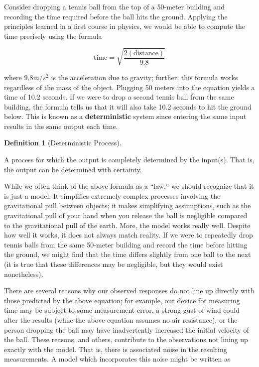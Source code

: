 \documentclass[
  letterpaper,
  DIV=11,
  numbers=noendperiod]{scrreprt}
\theoremstyle{definition}
\newtheorem{definition}{Definition}[chapter]
\theoremstyle{definition}
\theoremstyle{plain}
\theoremstyle{remark}
\begin{document}
Consider dropping a tennis ball from the top of a 50-meter building and
recording the time required before the ball hits the ground. Applying
the principles learned in a first course in physics, we would be able to
compute the time precisely using the formula

\[\text{time} = \sqrt{\frac{2(\text{distance})}{9.8}}\]

where \(9.8 m/s^2\) is the acceleration due to gravity; further, this
formula works regardless of the mass of the object. Plugging 50 meters
into the equation yields a time of 10.2 seconds. If we were to drop a
second tennis ball from the same building, the formula tells us that it
will also take 10.2 seconds to hit the ground below. This is known as a
\textbf{deterministic} system since entering the same input results in
the same output each time.

\begin{definition}[Deterministic
Process]\protect\hypertarget{def-deterministic-process}{}\label{def-deterministic-process}

A process for which the output is completely determined by the input(s).
That is, the output can be determined with certainty.

\end{definition}

While we often think of the above formula as a ``law,'' we should
recognize that it is just a model. It simplifies extremely complex
processes involving the gravitational pull between objects; it makes
simplifying assumptions, such as the gravitational pull of your hand
when you release the ball is negligible compared to the gravitational
pull of the earth. More, the model works really well. Despite how well
it works, it does not always match reality. If we were to repeatedly
drop tennis balls from the same 50-meter building and record the time
before hitting the ground, we might find that the time differs slightly
from one ball to the next (it is true that these differences may be
negligible, but they would exist nonetheless).

There are several reasons why our observed responses do not line up
directly with those predicted by the above equation; for example, our
device for measuring time may be subject to some measurement error, a
strong gust of wind could alter the results (while the above equation
assumes no air resistance), or the person dropping the ball may have
inadvertently increased the initial velocity of the ball. These reasons,
and others, contribute to the observations not lining up exactly with
the model. That is, there is associated noise in the resulting
measurements. A model which incorporates this noise might be written as
\end{document}
